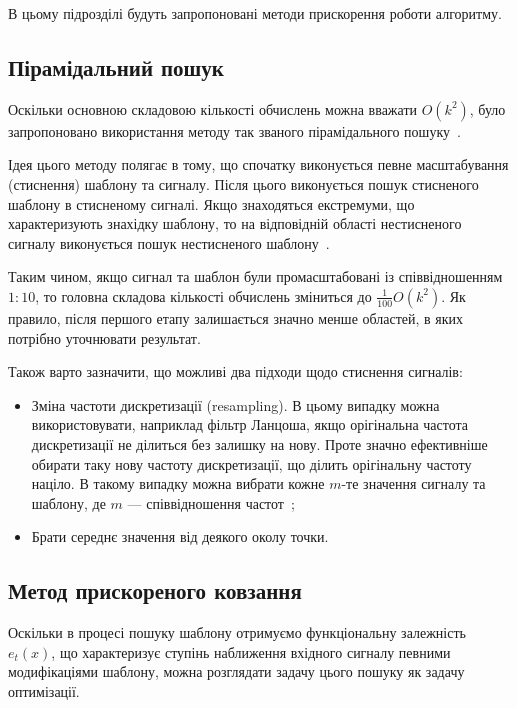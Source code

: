     В цьому підрозділі будуть запропоновані методи прискорення роботи алгоритму.

    \subsection{Пірамідальний пошук}
        Оскільки основною складовою кількості обчислень можна вважати $O(k^2)$, було запропоновано використання методу
        так званого пірамідального пошуку~\cite{book1,mine}.

        Ідея цього методу полягає в тому, що спочатку виконується певне масштабування (стиснення) шаблону та сигналу.
        Після цього виконується пошук стисненого шаблону в стисненому сигналі.
        Якщо знаходяться екстремуми, що характеризують знахідку шаблону, то на відповідній області нестисненого
        сигналу виконується пошук нестисненого шаблону~\cite{book2}.

        Таким чином, якщо сигнал та шаблон були промасштабовані із співвідношенням $1:10$, то головна складова
        кількості обчислень зміниться до $\frac{1}{100} O(k^2)$.
        Як правило, після першого етапу залишається значно менше областей, в яких потрібно уточнювати результат.

        Також варто зазначити, що можливі два підходи щодо стиснення сигналів:
        \begin{itemize}
            \item Зміна частоти дискретизації (resampling).
                В цьому випадку можна використовувати, наприклад фільтр Ланцоша, якщо орігінальна частота
                дискретизації не ділиться без залишку на нову.
                Проте значно ефективніше обирати таку нову частоту дискретизації, що ділить орігінальну частоту
                націло.
                В такому випадку можна вибрати кожне $m$-те значення сигналу та шаблону, де $m$ --- співвідношення
                частот~\cite{book3};
            \item Брати середнє значення від деякого околу точки.
        \end{itemize}
    \subsection{Метод прискореного ковзання}
        Оскільки в процесі пошуку шаблону отримуємо функціональну залежність $e_t(x)$, що характеризує ступінь
        наближення вхідного сигналу певними модифікаціями шаблону, можна розглядати задачу цього пошуку як задачу
        оптимізації.


